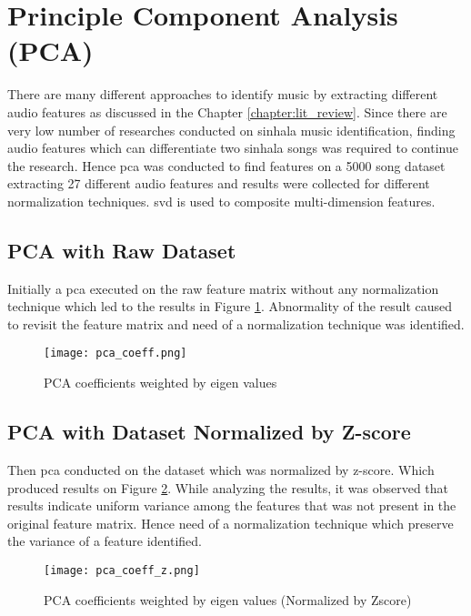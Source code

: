 \section{Principle Component Analysis (PCA)}
There are many different approaches to identify music by extracting different audio features as
discussed in the Chapter \ref{chapter:lit_review}. Since there are very low number of researches
conducted on sinhala music identification, finding audio features which can differentiate two 
sinhala songs was required to continue the research. Hence \ac{pca} was conducted to find features
on a 5000 song dataset extracting 27 different audio features and results were collected for 
different normalization techniques. \ac{svd} is used to composite multi-dimension features.

\subsection{PCA with Raw Dataset}

Initially a \ac{pca} executed on the raw feature matrix without any normalization technique
which led to the results in Figure \ref{fig:pca_coeff}. Abnormality of the result caused to 
revisit the feature matrix and need of a normalization technique was identified. 

\begin{figure}[H]
    \centering
    \texttt{[image: pca\_coeff.png]}
    \caption{PCA coefficients weighted by eigen values}
    \label{fig:pca_coeff}
\end{figure}

\subsection{PCA with Dataset Normalized by Z-score}

Then \ac{pca} conducted on the dataset which was normalized by z-score. Which produced results
on Figure \ref{fig:pca_coeff_z}. While analyzing the results, it was observed that results
indicate uniform variance among the features that was not present in the original feature
matrix. Hence need of a normalization technique which preserve the variance of a feature 
identified. 

\begin{figure}[H]
    \centering
    \texttt{[image: pca\_coeff\_z.png]}
    \caption{PCA coefficients weighted by eigen values (Normalized by Zscore)}
    \label{fig:pca_coeff_z}
\end{figure}

